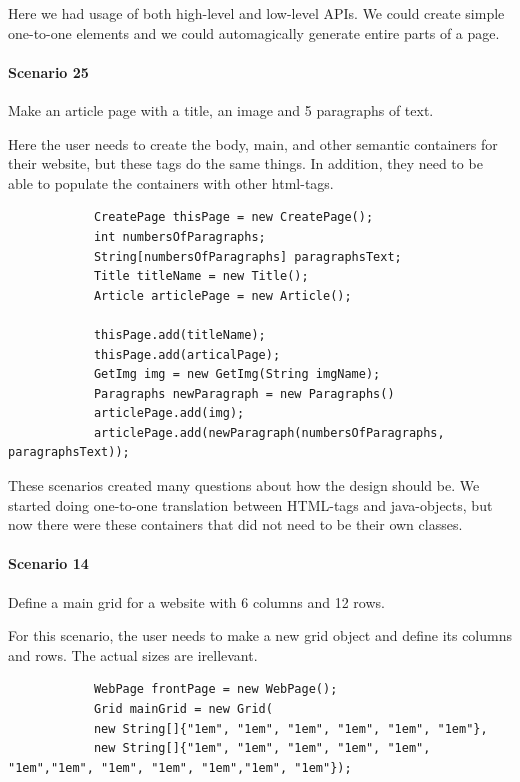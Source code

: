 \documentclass[12pt]{article}
\begin{document}
    Here we had usage of both high-level and low-level APIs. We could create simple one-to-one elements and we could automagically generate entire parts of a page. 

    \paragraph{Scenario 25}
    Make an article page with a title, an image and 5 paragraphs of text.

    Here the user needs to create the body, main, and other semantic containers for their website, but these tags do the same things. In addition, they need to be able to populate the containers with other html-tags.

    \begin{shaded}
        \begin{lstlisting}
            CreatePage thisPage = new CreatePage();
            int numbersOfParagraphs;
            String[numbersOfParagraphs] paragraphsText;
            Title titleName = new Title();
            Article articlePage = new Article();

            thisPage.add(titleName);
            thisPage.add(articalPage);
            GetImg img = new GetImg(String imgName);
            Paragraphs newParagraph = new Paragraphs()
            articlePage.add(img);
            articlePage.add(newParagraph(numbersOfParagraphs, paragraphsText));

        \end{lstlisting}
    \end{shaded}
    
    These scenarios created many questions about how the design should be. We started doing one-to-one translation between HTML-tags and java-objects, but now there were these containers that did not need to be their own classes.

    \paragraph{Scenario 14}
    Define a main grid for a website with 6 columns and 12 rows.
    
    For this scenario, the user needs to make a new grid object and define its columns and rows. The actual sizes are irellevant. 

    \begin{shaded}
        \begin{lstlisting}
            WebPage frontPage = new WebPage();
            Grid mainGrid = new Grid(
            new String[]{"1em", "1em", "1em", "1em", "1em", "1em"},
            new String[]{"1em", "1em", "1em", "1em", "1em", "1em","1em", "1em", "1em", "1em","1em", "1em"});
        \end{lstlisting}
    \end{shaded}
\end{document}
